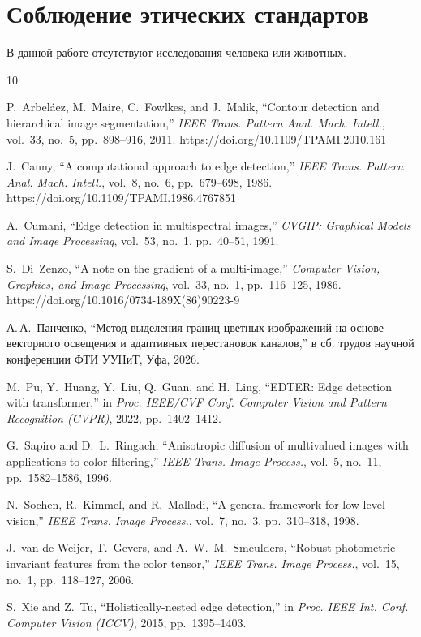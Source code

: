\documentclass[11pt,a4paper]{article}
\theoremstyle{plain}
\theoremstyle{definition}
\theoremstyle{remark}
\begin{document}
\section*{Соблюдение этических стандартов}

В данной работе отсутствуют исследования человека или животных.

\begin{thebibliography}{10}

P.~Arbel\'aez, M.~Maire, C.~Fowlkes, and J.~Malik,
``Contour detection and hierarchical image segmentation,''
\emph{IEEE Trans. Pattern Anal. Mach. Intell.},
vol.~33, no.~5, pp.~898--916, 2011.
https://doi.org/10.1109/TPAMI.2010.161

J.~Canny,
``A computational approach to edge detection,''
\emph{IEEE Trans. Pattern Anal. Mach. Intell.},
vol.~8, no.~6, pp.~679--698, 1986.
https://doi.org/10.1109/TPAMI.1986.4767851

A.~Cumani,
``Edge detection in multispectral images,''
\emph{CVGIP: Graphical Models and Image Processing},
vol.~53, no.~1, pp.~40--51, 1991.

S.~Di~Zenzo,
``A note on the gradient of a multi-image,''
\emph{Computer Vision, Graphics, and Image Processing},
vol.~33, no.~1, pp.~116--125, 1986.
https://doi.org/10.1016/0734-189X(86)90223-9

А.\,А.~Панченко,
``Метод выделения границ цветных изображений на основе векторного освещения
и адаптивных перестановок каналов,''
в сб. трудов научной конференции ФТИ УУНиТ, Уфа, 2026.

M.~Pu, Y.~Huang, Y.~Liu, Q.~Guan, and H.~Ling,
``EDTER: Edge detection with transformer,''
in \emph{Proc. IEEE/CVF Conf. Computer Vision and Pattern Recognition (CVPR)},
2022, pp.~1402--1412.

G.~Sapiro and D.~L.~Ringach,
``Anisotropic diffusion of multivalued images with applications to color
filtering,''
\emph{IEEE Trans. Image Process.},
vol.~5, no.~11, pp.~1582--1586, 1996.

N.~Sochen, R.~Kimmel, and R.~Malladi,
``A general framework for low level vision,''
\emph{IEEE Trans. Image Process.},
vol.~7, no.~3, pp.~310--318, 1998.

J.~van de Weijer, T.~Gevers, and A.~W.~M.~Smeulders,
``Robust photometric invariant features from the color tensor,''
\emph{IEEE Trans. Image Process.},
vol.~15, no.~1, pp.~118--127, 2006.

S.~Xie and Z.~Tu,
``Holistically-nested edge detection,''
in \emph{Proc. IEEE Int. Conf. Computer Vision (ICCV)}, 2015, pp.~1395--1403.

\end{thebibliography}
\end{document}
